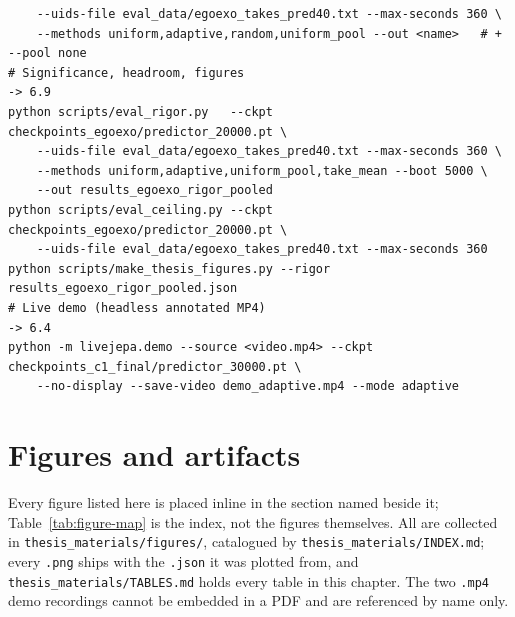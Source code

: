 \begin{lstlisting}
    --uids-file eval_data/egoexo_takes_pred40.txt --max-seconds 360 \
    --methods uniform,adaptive,random,uniform_pool --out <name>   # + --pool none
# Significance, headroom, figures                                       -> 6.9
python scripts/eval_rigor.py   --ckpt checkpoints_egoexo/predictor_20000.pt \
    --uids-file eval_data/egoexo_takes_pred40.txt --max-seconds 360 \
    --methods uniform,adaptive,uniform_pool,take_mean --boot 5000 \
    --out results_egoexo_rigor_pooled
python scripts/eval_ceiling.py --ckpt checkpoints_egoexo/predictor_20000.pt \
    --uids-file eval_data/egoexo_takes_pred40.txt --max-seconds 360
python scripts/make_thesis_figures.py --rigor results_egoexo_rigor_pooled.json
# Live demo (headless annotated MP4)                                    -> 6.4
python -m livejepa.demo --source <video.mp4> --ckpt checkpoints_c1_final/predictor_30000.pt \
    --no-display --save-video demo_adaptive.mp4 --mode adaptive
\end{lstlisting}

\section{Figures and artifacts}

Every figure listed here is placed inline in the section named beside it; Table~\ref{tab:figure-map} is the index, not the figures themselves. All are collected in \texttt{thesis\_materials/figures/}, catalogued by \texttt{thesis\_materials/INDEX.md}; every \texttt{.png} ships with the \texttt{.json} it was plotted from, and \texttt{thesis\_materials/TABLES.md} holds every table in this chapter. The two \texttt{.mp4} demo recordings cannot be embedded in a PDF and are referenced by name only.

